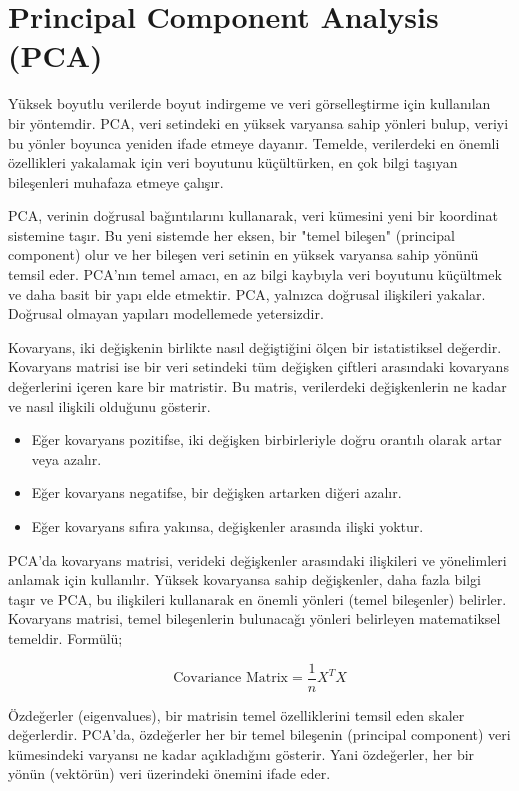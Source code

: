 \section{Principal Component Analysis (PCA)}

Yüksek boyutlu verilerde boyut indirgeme ve veri görselleştirme için kullanılan bir yöntemdir. PCA, veri setindeki en yüksek varyansa sahip yönleri bulup, veriyi bu yönler boyunca yeniden ifade etmeye dayanır. Temelde, verilerdeki en önemli özellikleri yakalamak için veri boyutunu küçültürken, en çok bilgi taşıyan bileşenleri muhafaza etmeye çalışır. 

PCA, verinin doğrusal bağıntılarını kullanarak, veri kümesini yeni bir koordinat sistemine taşır. Bu yeni sistemde her eksen, bir "temel bileşen" (principal component) olur ve her bileşen veri setinin en yüksek varyansa sahip yönünü temsil eder. PCA'nın temel amacı, en az bilgi kaybıyla veri boyutunu küçültmek ve daha basit bir yapı elde etmektir. PCA, yalnızca doğrusal ilişkileri yakalar. Doğrusal olmayan yapıları modellemede yetersizdir.

Kovaryans, iki değişkenin birlikte nasıl değiştiğini ölçen bir istatistiksel değerdir. Kovaryans matrisi ise bir veri setindeki tüm değişken çiftleri arasındaki kovaryans değerlerini içeren kare bir matristir. Bu matris, verilerdeki değişkenlerin ne kadar ve nasıl ilişkili olduğunu gösterir.

\begin{itemize}
    \item Eğer kovaryans pozitifse, iki değişken birbirleriyle doğru orantılı olarak artar veya azalır.
    \item Eğer kovaryans negatifse, bir değişken artarken diğeri azalır.
    \item Eğer kovaryans sıfıra yakınsa, değişkenler arasında ilişki yoktur.
\end{itemize}

PCA'da kovaryans matrisi, verideki değişkenler arasındaki ilişkileri ve yönelimleri anlamak için kullanılır. Yüksek kovaryansa sahip değişkenler, daha fazla bilgi taşır ve PCA, bu ilişkileri kullanarak en önemli yönleri (temel bileşenler) belirler. Kovaryans matrisi, temel bileşenlerin bulunacağı yönleri belirleyen matematiksel temeldir. Formülü;

\[ \text{Covariance Matrix} = \frac{1}{n} X^T X \]

Özdeğerler (eigenvalues), bir matrisin temel özelliklerini temsil eden skaler değerlerdir. PCA'da, özdeğerler her bir temel bileşenin (principal component) veri kümesindeki varyansı ne kadar açıkladığını gösterir. Yani özdeğerler, her bir yönün (vektörün) veri üzerindeki önemini ifade eder.

